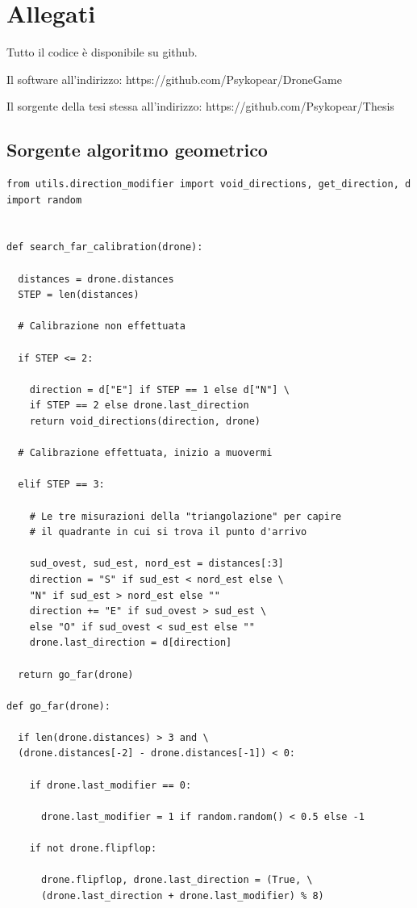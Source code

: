 \chapter{Allegati}
Tutto il codice è disponibile su github.

Il software all'indirizzo: https://github.com/Psykopear/DroneGame

Il sorgente della tesi stessa all'indirizzo: https://github.com/Psykopear/Thesis

\section{Sorgente algoritmo geometrico}
\begin{verbatim}
from utils.direction_modifier import void_directions, get_direction, d
import random


def search_far_calibration(drone):

  distances = drone.distances
  STEP = len(distances)

  # Calibrazione non effettuata

  if STEP <= 2:

    direction = d["E"] if STEP == 1 else d["N"] \
    if STEP == 2 else drone.last_direction
    return void_directions(direction, drone)

  # Calibrazione effettuata, inizio a muovermi

  elif STEP == 3:

    # Le tre misurazioni della "triangolazione" per capire
    # il quadrante in cui si trova il punto d'arrivo

    sud_ovest, sud_est, nord_est = distances[:3]
    direction = "S" if sud_est < nord_est else \
    "N" if sud_est > nord_est else ""
    direction += "E" if sud_ovest > sud_est \
    else "O" if sud_ovest < sud_est else ""
    drone.last_direction = d[direction]

  return go_far(drone) 

def go_far(drone):

  if len(drone.distances) > 3 and \
  (drone.distances[-2] - drone.distances[-1]) < 0:

    if drone.last_modifier == 0:

      drone.last_modifier = 1 if random.random() < 0.5 else -1

    if not drone.flipflop:

      drone.flipflop, drone.last_direction = (True, \
      (drone.last_direction + drone.last_modifier) % 8)


\end{verbatim}
